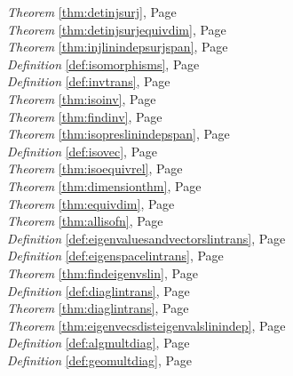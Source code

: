 \begin{multicols}{3}
\begin{center}
      \textit{Theorem} \ref{thm:detinjsurj}, Page \pageref{thm:detinjsurj} \\
      \textit{Theorem} \ref{thm:detinjsurjequivdim}, Page \pageref{thm:detinjsurjequivdim} \\
      \textit{Theorem} \ref{thm:injlinindepsurjspan}, Page \pageref{thm:injlinindepsurjspan} \\
      \textit{Definition} \ref{def:isomorphisms}, Page \pageref{def:isomorphisms} \\
      \textit{Definition} \ref{def:invtrans}, Page \pageref{def:invtrans} \\
      \textit{Theorem} \ref{thm:isoinv}, Page \pageref{thm:isoinv} \\
      \textit{Theorem} \ref{thm:findinv}, Page \pageref{thm:findinv} \\
      \textit{Theorem} \ref{thm:isopreslinindepspan}, Page \pageref{thm:isopreslinindepspan} \\
      \textit{Definition} \ref{def:isovec}, Page \pageref{def:isovec} \\
      \textit{Theorem} \ref{thm:isoequivrel}, Page \pageref{thm:isoequivrel} \\
      \textit{Theorem} \ref{thm:dimensionthm}, Page \pageref{thm:dimensionthm} \\
      \textit{Theorem} \ref{thm:equivdim}, Page \pageref{thm:equivdim} \\
      \textit{Theorem} \ref{thm:allisofn}, Page \pageref{thm:allisofn} \\
      \textit{Definition} \ref{def:eigenvaluesandvectorslintrans}, Page \pageref{def:eigenvaluesandvectorslintrans} \\
      \textit{Definition} \ref{def:eigenspacelintrans}, Page \pageref{def:eigenspacelintrans} \\
      \textit{Theorem} \ref{thm:findeigenvslin}, Page \pageref{thm:findeigenvslin} \\
      \textit{Definition} \ref{def:diaglintrans}, Page \pageref{def:diaglintrans} \\
      \textit{Theorem} \ref{thm:diaglintrans}, Page \pageref{thm:diaglintrans} \\
      \textit{Theorem} \ref{thm:eigenvecsdisteigenvalslinindep}, Page \pageref{thm:eigenvecsdisteigenvalslinindep} \\
      \textit{Definition} \ref{def:algmultdiag}, Page \pageref{def:algmultdiag} \\
      \textit{Definition} \ref{def:geomultdiag}, Page \pageref{def:geomultdiag} \\

\end{center}
\end{multicols}
